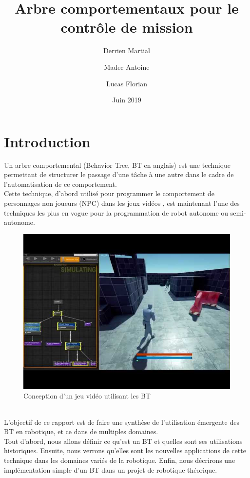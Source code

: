 \documentclass[titlepage]{article}
\title{Arbre comportementaux pour le contr\^ole de mission}
\author{
	Derrien Martial \\
	\and
	Madec Antoine \\
	\and
	Lucas Florian
}
\date{Juin 2019}
\begin{document}
	\maketitle
	\tableofcontents
	\hypersetup{linktocpage}
	
	\clearpage
	\section{Introduction}
	Un arbre comportemental (Behavior Tree, BT en anglais) est une
	technique permettant de structurer le passage d'une tâche à une autre dans 
	le cadre de l'automatisation de ce comportement.
	\\
	Cette technique, d'abord utilisé pour programmer le comportement de personnages non joueurs (NPC) dans les jeux vidéos \cite{wikipedia_BT}, est maintenant l'une des techniques les plus en vogue pour la programmation de robot autonome ou semi-autonome\cite{ros.org}.
	\\
	\begin{figure}[h!]
		\includegraphics[width=\linewidth]{img/videogame_tree.jpg}
		\caption{Conception d'un jeu vidéo utilisant les BT}
		\label{fig:BT2}
	\end{figure}
	\\
	L'objectif de ce rapport est de faire une synthèse de l'utilisation émergente des BT en robotique, et ce dans de multiples domaines.
	\\
	Tout d'abord, nous allons définir ce qu'est un BT et quelles sont ses utilisations historiques. Ensuite, nous verrons qu'elles sont les nouvelles applications de cette technique dans les domaines variés de la robotique. Enfin, nous décrirons une implémentation simple d'un BT dans un projet de robotique théorique.
	\clearpage
\end{document}
